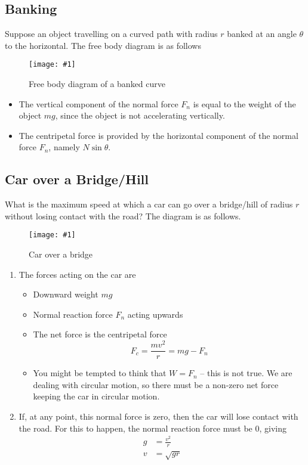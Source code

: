 \documentclass[a4paper,12pt]{article}
\newcommand{\img}[4]{\begin{center}
  \begin{figure}[H]
    \centering
    \texttt{[image: \#1]}
    \caption{#3}
    \label{fig:#4}
  \end{figure}
\end{center}}
\begin{document}
\subsection{Banking}

Suppose an object travelling on a curved path with radius $r$ banked at an angle $\theta$ to the horizontal. The free body diagram is as follows
\img{material/banking.png}{0.4}{Free body diagram of a banked curve}{banking}
\begin{itemize}
  \item The vertical component of the normal force $F_n$ is equal to the weight of the object $mg$, since the object is not accelerating vertically.
  \item The centripetal force is provided by the horizontal component of the normal force $F_n$, namely $N \sin \theta$.
\end{itemize}

\pagebreak

\subsection{Car over a Bridge/Hill}

What is the maximum speed at which a car can go over a bridge/hill of radius $r$ without losing contact with the road? The diagram is as follows.

\img{material/bridge.png}{0.4}{Car over a bridge}{bridge}
\begin{enumerate}
  \item The forces acting on the car are
        \begin{itemize}
          \item Downward weight $mg$
          \item Normal reaction force $F_n$ acting upwards
          \item The net force is the centripetal force
                $$F_c = \frac{mv^2}{r} = mg - F_n$$
          \item You might be tempted to think that $W = F_n$ -- this is not true. We are dealing with circular motion, so there must be a non-zero net force keeping the car in circular motion.

        \end{itemize}
  \item If, at any point, this normal force is zero, then the car will lose contact with the road. For this to happen, the normal reaction force must be $0$, giving
        \begin{align*}
          g & = \frac{v^2}{r} \\
          v & = \sqrt{gr}
        \end{align*}
\end{enumerate}
\end{document}
